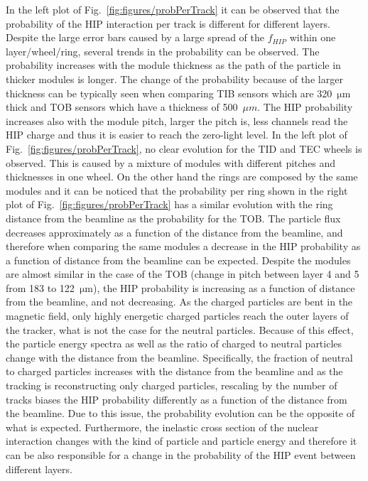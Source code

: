 In the left plot of Fig.~\ref{fig:figures/probPerTrack} it can be observed that the probability of the HIP interaction per track is different for different layers. Despite the large error bars caused by a large spread of the $f_{HIP}$ within one layer/wheel/ring, several trends in the probability can be observed. The probability increases with the module thickness as the path of the particle in thicker modules is longer. The change of the probability because of the larger thickness can be typically seen when comparing TIB sensors which are 320~$\mathrm{\mu m}$ thick and TOB sensors which have a thickness of 500~$\mu m$. The HIP probability increases also with the module pitch, larger the pitch is, less channels read the HIP charge and thus it is easier to reach the zero-light level. In the left plot of Fig.~\ref{fig:figures/probPerTrack}, no clear evolution for the TID and TEC wheels is observed. This is caused by a mixture of modules with different pitches and thicknesses in one wheel. On the other hand the rings are composed by the same modules and it can be noticed that the probability per ring shown in the right plot of Fig.~\ref{fig:figures/probPerTrack} has a similar evolution with the ring distance from the beamline as the probability for the TOB. The particle flux decreases approximately as a function of the distance from the beamline, and therefore when comparing the same modules a decrease in the HIP probability as a function of distance from the beamline can be expected. Despite the modules are almost similar in the case of the TOB (change in pitch between layer 4 and 5 from 183 to 122~$\mathrm{\mu m}$), the HIP probability is increasing as a function of distance from the beamline, and not decreasing. As the charged particles are bent in the magnetic field, only highly energetic charged particles reach the outer layers of the tracker, what is not the case for the neutral particles. Because of this effect, the particle energy spectra as well as the ratio of charged to neutral particles change with the distance from the beamline. Specifically, the fraction of neutral to charged particles increases with the distance from the beamline and as the tracking is reconstructing only charged particles, rescaling by the number of tracks biases the HIP probability differently as a function of the distance from the beamline. Due to this issue, the probability evolution can be the opposite of what is expected. Furthermore, the inelastic cross section of the nuclear interaction changes with the kind of particle and particle energy and therefore it can be also responsible for a change in the probability of the HIP event between different layers.  


